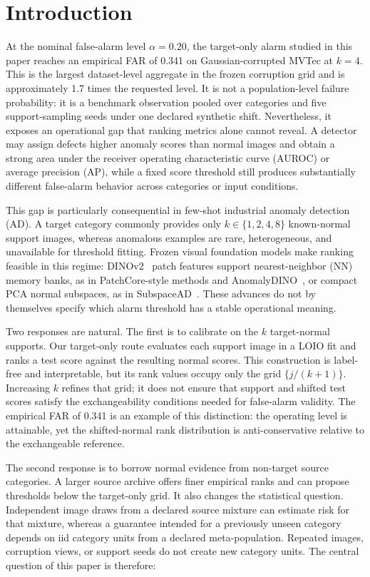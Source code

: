 \section{Introduction}\label{sec:introduction}
At the nominal false-alarm level $\alpha=0.20$, the target-only alarm studied in this paper reaches an empirical FAR of 0.341 on Gaussian-corrupted MVTec at $k=4$. This is the largest dataset-level aggregate in the frozen corruption grid and is approximately 1.7 times the requested level. It is not a population-level failure probability: it is a benchmark observation pooled over categories and five support-sampling seeds under one declared synthetic shift. Nevertheless, it exposes an operational gap that ranking metrics alone cannot reveal. A detector may assign defects higher anomaly scores than normal images and obtain a strong area under the receiver operating characteristic curve (AUROC) or average precision (AP), while a fixed score threshold still produces substantially different false-alarm behavior across categories or input conditions.

This gap is particularly consequential in few-shot industrial anomaly detection (AD). A target category commonly provides only $k\in\{1,2,4,8\}$ known-normal support images, whereas anomalous examples are rare, heterogeneous, and unavailable for threshold fitting. Frozen visual foundation models make ranking feasible in this regime: DINOv2~\cite{oquab2024dinov2} patch features support nearest-neighbor (NN) memory banks, as in PatchCore-style methods and AnomalyDINO~\cite{roth2022towards,damm2025anomalydino}, or compact PCA normal subspaces, as in SubspaceAD~\cite{subspacead2026}. These advances do not by themselves specify which alarm threshold has a stable operational meaning.

Two responses are natural. The first is to calibrate on the $k$ target-normal supports. Our target-only route evaluates each support image in a LOIO fit and ranks a test score against the resulting normal scores. This construction is label-free and interpretable, but its rank values occupy only the grid $\{j/(k+1)\}$. Increasing $k$ refines that grid; it does not ensure that support and shifted test scores satisfy the exchangeability conditions needed for false-alarm validity. The empirical FAR of 0.341 is an example of this distinction: the operating level is attainable, yet the shifted-normal rank distribution is anti-conservative relative to the exchangeable reference.

The second response is to borrow normal evidence from non-target source categories. A larger source archive offers finer empirical ranks and can propose thresholds below the target-only grid. It also changes the statistical question. Independent image draws from a declared source mixture can estimate risk for that mixture, whereas a guarantee intended for a previously unseen category depends on iid category units from a declared meta-population. Repeated images, corruption views, or support seeds do not create new category units. The central question of this paper is therefore:

